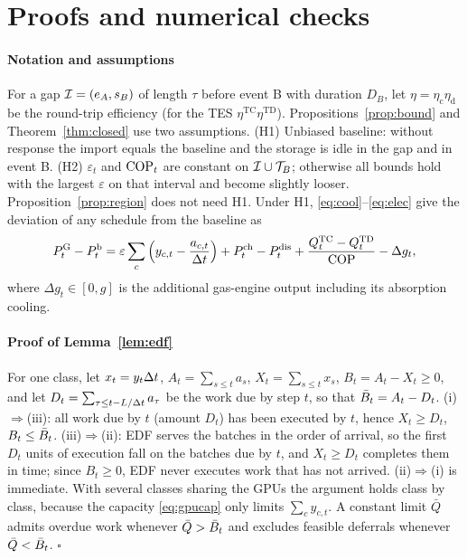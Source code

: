 \section{Proofs and numerical checks}
\label{app:proofs}
\appendixnumbering

\paragraph{Notation and assumptions} For a gap $\mathcal{I}=(e_A,s_B)$ of length $\tau$ before event B with duration
$D_B$, let $\eta=\eta_{\mathrm c}\eta_{\mathrm d}$ be the round-trip efficiency (for the TES $\eta^{\mathrm{TC}}\eta^{\mathrm{TD}}$).
Propositions~\ref{prop:bound} and Theorem~\ref{thm:closed} use two assumptions. (H1) Unbiased baseline: without
response the import equals the baseline and the storage is idle in the gap and in event B. (H2) $\varepsilon_t$ and
$\mathrm{COP}_t$ are constant on $\mathcal{I}\cup\mathcal{T}_B$; otherwise all bounds hold with the largest $\varepsilon$ on that interval
and become slightly looser. Proposition~\ref{prop:region} does not need H1. Under H1, \eqref{eq:cool}--\eqref{eq:elec}
give the deviation of any schedule from the baseline as
\begin{equation}
P^{\mathrm{G}}_t-P^{\mathrm{b}}_t=\varepsilon\sum_c\Big(y_{c,t}-\frac{a_{c,t}}{\Delta t}\Big)+P^{\mathrm{ch}}_t-P^{\mathrm{dis}}_t+\frac{Q^{\mathrm{TC}}_t-Q^{\mathrm{TD}}_t}{\mathrm{COP}}-\Delta g_t ,
\label{eq:deviation}
\end{equation}
where $\Delta g_t\in[0,g]$ is the additional gas-engine output including its absorption cooling.

\paragraph{Proof of Lemma~\ref{lem:edf}} For one class, let $x_t=y_t\Delta t$, $A_t=\sum_{s\le t}a_s$, $X_t=\sum_{s\le
t}x_s$, $B_t=A_t-X_t\ge0$, and let $D_t=\sum_{\tau\le t-L/\Delta t}a_\tau$ be the work due by step $t$, so that
$\bar B_t=A_t-D_t$. (i)$\Rightarrow$(iii): all work due by $t$ (amount $D_t$) has been executed by $t$, hence $X_t\ge D_t$,
\ie\ $B_t\le\bar B_t$. (iii)$\Rightarrow$(ii): EDF serves the batches in the order of arrival, so the first $D_t$ units of
execution fall on the batches due by $t$, and $X_t\ge D_t$ completes them in time; since $B_t\ge0$, EDF never executes
work that has not arrived. (ii)$\Rightarrow$(i) is immediate. With several classes sharing the GPUs the argument holds
class by class, because the capacity \eqref{eq:gpucap} only limits $\sum_cy_{c,t}$. A constant limit $\bar Q$ admits
overdue work whenever $\bar Q>\bar B_t$ and excludes feasible deferrals whenever $\bar Q<\bar B_t$. $\square$

